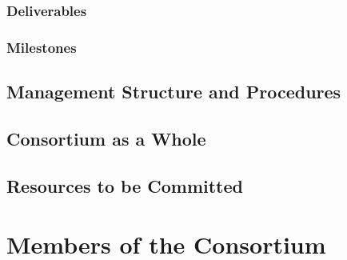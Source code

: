 \documentclass[noworkareas,deliverables,\classoptions]{euproposal}       %
\begin{document}
\begin{proposal}


\gantttaskchart[draft,xscale=.33,yscale=.33,milestones]

\newpage
\subsubsection{Deliverables}\label{sec:deliverables}

\newpage
\subsubsection{Milestones}\label{sec:milestones}





\newpage
\subsection{Management Structure and Procedures}


\draftpage
\subsection{Consortium as a Whole}

\draftpage

\subsection{Resources to be Committed}



\newpage


\section{Members of the Consortium}


\end{proposal}
\end{document}
